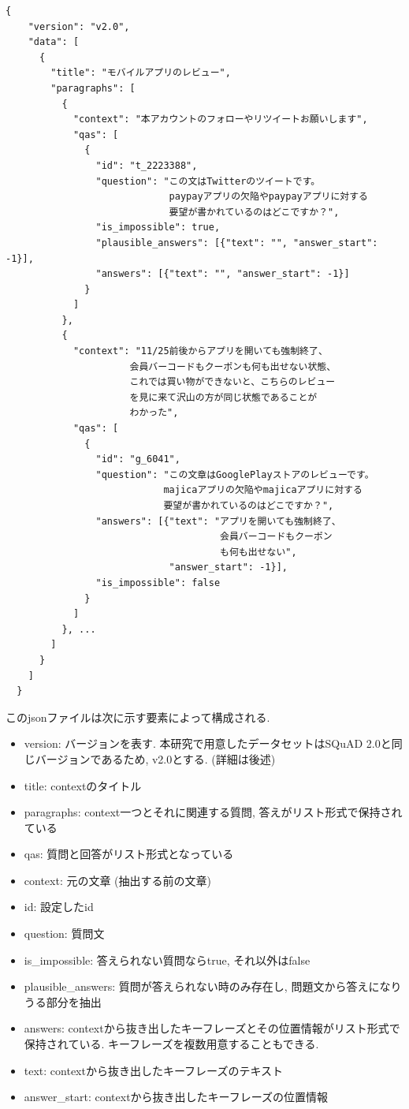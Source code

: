 \begin{lstlisting}[caption=データセット.json,label=json]
  {
    "version": "v2.0", 
    "data": [
      {
        "title": "モバイルアプリのレビュー", 
        "paragraphs": [
          {
            "context": "本アカウントのフォローやリツイートお願いします",
            "qas": [
              {
                "id": "t_2223388",
                "question": "この文はTwitterのツイートです。
                             paypayアプリの欠陥やpaypayアプリに対する
                             要望が書かれているのはどこですか？",
                "is_impossible": true,
                "plausible_answers": [{"text": "", "answer_start": -1}],
                "answers": [{"text": "", "answer_start": -1}]
              }
            ]
          },
          {
            "context": "11/25前後からアプリを開いても強制終了、
                      会員バーコードもクーポンも何も出せない状態、
                      これでは買い物ができないと、こちらのレビュー
                      を見に来て沢山の方が同じ状態であることが
                      わかった",
            "qas": [
              {
                "id": "g_6041", 
                "question": "この文章はGooglePlayストアのレビューです。
                            majicaアプリの欠陥やmajicaアプリに対する
                            要望が書かれているのはどこですか？",
                "answers": [{"text": "アプリを開いても強制終了、
                                      会員バーコードもクーポン
                                      も何も出せない", 
                             "answer_start": -1}], 
                "is_impossible": false
              }
            ]
          }, ...
        ]
      }
    ]
  } 
\end{lstlisting}
\noindent
このjsonファイルは次に示す要素によって構成される. 

\begin{itemize}
  \item version: バージョンを表す. 本研究で用意したデータセットはSQuAD 2.0と同じバージョンであるため, v2.0とする. (詳細は後述)
  \item title: contextのタイトル
  \item paragraphs: context一つとそれに関連する質問, 答えがリスト形式で保持されている
  \item qas: 質問と回答がリスト形式となっている
  \item context: 元の文章 (抽出する前の文章) 
  \item id: 設定したid
  \item question: 質問文
  \item is\_impossible: 答えられない質問ならtrue, それ以外はfalse
  \item plausible\_answers: 質問が答えられない時のみ存在し, 問題文から答えになりうる部分を抽出
  \item answers: contextから抜き出したキーフレーズとその位置情報がリスト形式で保持されている. キーフレーズを複数用意することもできる. 
  \item text: contextから抜き出したキーフレーズのテキスト
  \item answer\_start: contextから抜き出したキーフレーズの位置情報
\end{itemize}

